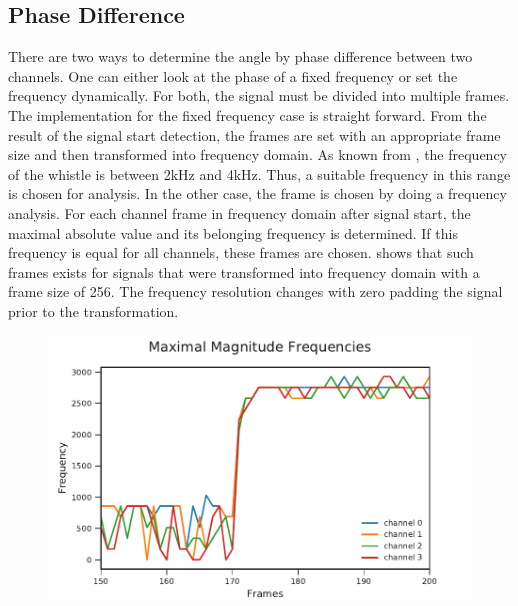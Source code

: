 \subsection*{Phase Difference}
\label{subsec:03_phase}


There are two ways to determine the angle by phase difference
between two channels.
One can either look at the phase of a fixed frequency or set the frequency
dynamically.
For both, the signal must be divided into multiple frames.
The implementation for the fixed frequency case is straight forward.
From the result of the signal start detection, the frames
are set with an appropriate frame size and then transformed into
frequency domain.
As known from \cite{Hasselbring}, the frequency of the whistle is between 2\si{\kilo\hertz}
and 4\si{\kilo\hertz}.
Thus, a suitable frequency in this range is chosen for analysis.
In the other case, the frame is chosen by doing a
frequency analysis.
For each channel frame in frequency domain after signal start,
the maximal absolute value and its belonging frequency is determined.
If this frequency is equal for all channels, these frames
are chosen.
 shows that such frames exists for signals that
were transformed into frequency domain with a frame size of 256.
The frequency resolution changes with zero padding the signal prior
to the transformation.
\begin{figure}[ht]
	\centering
		\includegraphics[]{figures/maxFreq}
	\caption{}
    \label{fig:03_maxFreq}
\end{figure}

